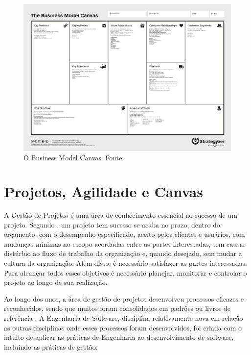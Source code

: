 \documentclass{article}
\newcommand{\othersize}{0.7\linewidth}
\begin{document}
\begin{figure}
    \centering
    \includegraphics[width=\othersize]{imagens/BMC.png}
    \caption{O Business Model Canvas. Fonte: \citet{osterwalder2010business}}
    \label{fig:bmc}
\end{figure}


\section{Projetos, Agilidade e Canvas}

A Gestão de Projetos é uma área de conhecimento essencial ao sucesso de um projeto. Segundo \citet{kerzner:12ed}, um projeto tem sucesso se 
acaba no prazo, dentro do orçamento, com o desempenho especificado, aceito pelos clientes e usuários, com mudanças mínimas no escopo acordadas entre as partes interessadas, sem causar distúrbio ao fluxo de trabalho da organização e, quando desejado, sem mudar a cultura da organização. Além disso, é necessário satisfazer as partes interessadas\citep{pmbok:6}. Para alcançar todos esses objetivos é necessário planejar, monitorar e controlar o projeto ao longo de sua realização.

Ao longo dos anos, a área de gestão de projetos desenvolveu processos eficazes e reconhecidos, sendo que muitos foram consolidados em padrões ou livros de referência \citep{pmbok:6,kerzner:12ed}. A Engenharia de Software, disciplina relativamente nova em relação as outras disciplinas onde esses processos foram desenvolvidos, foi criada com o intuito de aplicar as práticas de Engenharia ao desenvolvimento de software, incluindo as práticas de gestão\citep{naur:randell:1968,pressman:2019,ieee_computer_society_guide_2014}.
\end{document}
